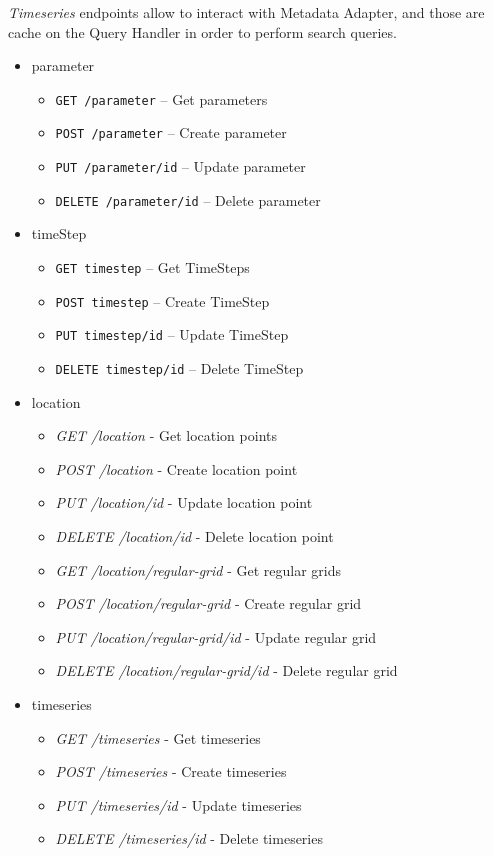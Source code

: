 \emph{Timeseries} endpoints allow to interact with Metadata Adapter, and those are cache on the Query Handler in order to perform search queries.
\begin{itemize}
    \item parameter
    \begin{itemize}
        \item \texttt{GET /parameter} -- Get parameters
        \item \texttt{POST /parameter} -- Create parameter
        \item \texttt{PUT /parameter/id} -- Update parameter
        \item \texttt{DELETE /parameter/id} -- Delete parameter
    \end{itemize}
    \item timeStep
    \begin{itemize}
        \item \texttt{GET timestep} -- Get TimeSteps
        \item \texttt{POST timestep} -- Create TimeStep
        \item \texttt{PUT timestep/id} -- Update TimeStep
        \item \texttt{DELETE timestep/id} -- Delete TimeStep
    \end{itemize}
    \item location
    \begin{itemize}
        \item \emph{GET /location} - Get location points
        \item \emph{POST /location} - Create location point
        \item \emph{PUT /location/id} - Update location point
        \item \emph{DELETE /location/id} - Delete location point
        \item \emph{GET /location/regular-grid} - Get regular grids
        \item \emph{POST /location/regular-grid} - Create regular grid
        \item \emph{PUT /location/regular-grid/id} - Update regular grid
        \item \emph{DELETE /location/regular-grid/id} - Delete regular grid
    \end{itemize}
    \item timeseries
    \begin{itemize}
        \item \emph{GET /timeseries} - Get timeseries
        \item \emph{POST /timeseries} - Create timeseries
        \item \emph{PUT /timeseries/id} - Update timeseries
        \item \emph{DELETE /timeseries/id} - Delete timeseries
    \end{itemize}
\end{itemize}

